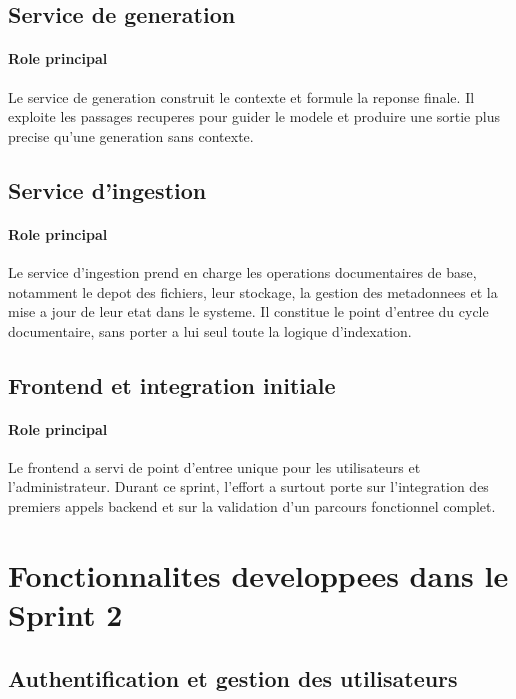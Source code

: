 \subsection{Service de generation}

\paragraph{Role principal}

Le service de generation construit le contexte et formule la reponse finale. Il exploite les passages recuperes pour guider le modele et produire une sortie plus precise qu'une generation sans contexte.

\subsection{Service d'ingestion}

\paragraph{Role principal}

Le service d'ingestion prend en charge les operations documentaires de base, notamment le depot des fichiers, leur stockage, la gestion des metadonnees et la mise a jour de leur etat dans le systeme. Il constitue le point d'entree du cycle documentaire, sans porter a lui seul toute la logique d'indexation.

\subsection{Frontend et integration initiale}

\paragraph{Role principal}

Le frontend a servi de point d'entree unique pour les utilisateurs et l'administrateur. Durant ce sprint, l'effort a surtout porte sur l'integration des premiers appels backend et sur la validation d'un parcours fonctionnel complet.

\section{Fonctionnalites developpees dans le Sprint 2}

\subsection{Authentification et gestion des utilisateurs}

